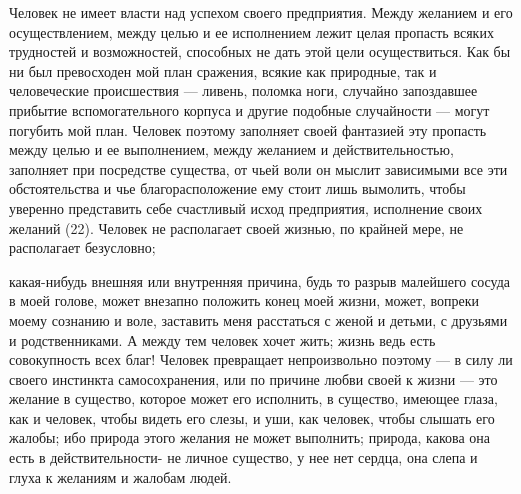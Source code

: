 \documentclass[12pt]{article}
\begin{document}
Человек не имеет власти над успехом своего предприятия. Между желанием и его осуществлением, между целью и ее исполнением лежит целая пропасть всяких трудностей и возможностей, способных не дать этой цели осуществиться. Как бы ни был превосходен мой план сражения, всякие как природные, так и человеческие происшествия --- ливень, поломка ноги, случайно запоздавшее прибытие вспомогательного корпуса и другие подобные случайности --- могут погубить мой план. Человек поэтому заполняет своей фантазией эту пропасть между целью и ее выполнением, между желанием и действительностью, заполняет при посредстве существа, от чьей воли он мыслит зависимыми все эти обстоятельства и чье благорасположение ему стоит лишь вымолить, чтобы уверенно представить себе счастливый исход предприятия, исполнение своих желаний (22). Человек не располагает своей жизнью, по крайней мере, не располагает безусловно; 

какая-нибудь внешняя или внутренняя причина, будь то разрыв малейшего сосуда в моей голове, может внезапно положить конец моей жизни, может, вопреки моему сознанию и воле, заставить меня расстаться с женой и детьми, с друзьями и родственниками. А между тем человек хочет жить; жизнь ведь есть совокупность всех благ! Человек превращает непроизвольно поэтому --- в силу ли своего инстинкта самосохранения, или по причине любви своей к жизни --- это желание в существо, которое может его исполнить, в существо, имеющее глаза, как и человек, чтобы видеть его слезы, и уши, как человек, чтобы слышать его жалобы; ибо природа этого желания не может выполнить; природа, какова она есть в действительности- не личное существо, у нее нет сердца, она слепа и глуха к желаниям и жалобам людей. 
\end{document}
